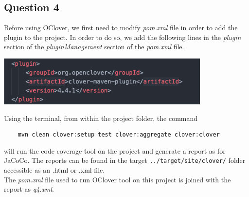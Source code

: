 \subsection*{Question 4}

\noindent Before using OClover, we first need to modify \textit{pom.xml} file in order to add the plugin to the project. In order to do so, we add the following lines in the \textit{plugin} section of the \textit{pluginManagement} section of the \textit{pom.xml} file.

\begin{center}
        \includegraphics[width=0.8\textwidth]{img/cloverxml.png}
\end{center}
\noindent Using the terminal, from within the project folder, the command
\begin{verbatim}
    mvn clean clover:setup test clover:aggregate clover:clover
\end{verbatim}
\noindent will run the code coverage tool on the project and generate a report as for JaCoCo. The reports can be found in the target \verb|../target/site/clover/| folder accessible as an .html or .xml file.\\
\noindent The \textit{pom.xml} file used to run OClover tool on this project is joined with the report as \textit{q4.xml}.
